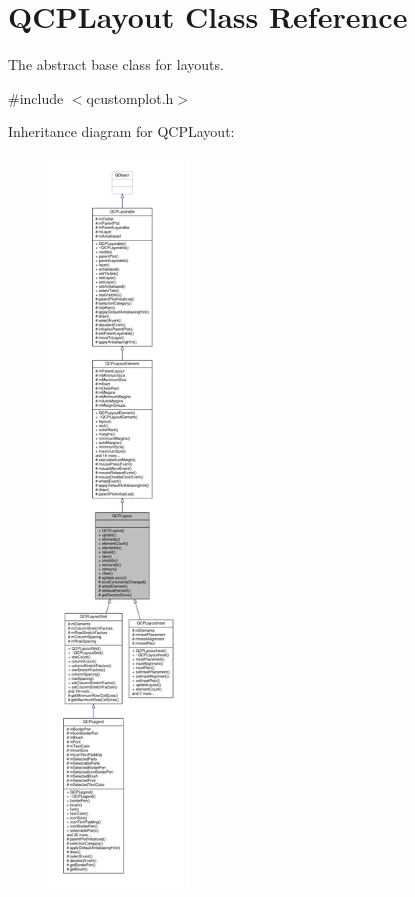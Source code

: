 \hypertarget{class_q_c_p_layout}{}\section{Q\+C\+P\+Layout Class Reference}
\label{class_q_c_p_layout}


The abstract base class for layouts.  




{\ttfamily \#include $<$qcustomplot.\+h$>$}



Inheritance diagram for Q\+C\+P\+Layout\+:\nopagebreak
\begin{figure}[H]
\begin{center}
\leavevmode
\includegraphics[height=550pt]{class_q_c_p_layout__inherit__graph}
\end{center}
\end{figure}


